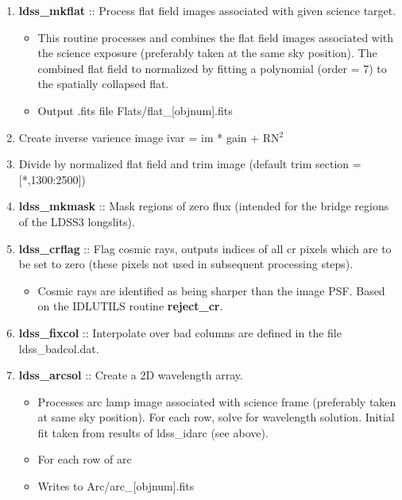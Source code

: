 \documentclass[11pt,letterpaper,dvips]{article}
\begin{document}
\begin{enumerate}
\begin{itemize}
	  \begin{enumerate}
	  \item {\bf ldss\_mkflat} :: Process flat field images
	  associated with given science target. 
	    \begin{itemize}
	      \item This routine processes and combines the flat field
		images associated with the science exposure
		(preferably taken at the same sky position).  The
		combined flat field to normalized by fitting a
		polynomial (order = 7) to the spatially collapsed flat.
	      \item  Output .fits file Flats/flat\_[objnum].fits
	    \end{itemize}

	\item Create inverse varience image ivar = im * gain + RN$^2$

	\item Divide by normalized flat field and trim image (default
	trim section = [*,1300:2500])

	\item {\bf ldss\_mkmask} :: Mask regions of zero flux (intended
	  for the bridge regions of the LDSS3 longslits).  


	\item {\bf ldss\_crflag} :: Flag cosmic rays, outputs indices
	  of all cr pixels which are to be set to zero (these pixels not used
	  in subsequent processing steps).
	    \begin{itemize}
	      \item Cosmic rays are identified as being sharper than
		the image PSF.  Based on the IDLUTILS routine {\bf
		reject\_cr}.
	    \end{itemize}

	\item {\bf ldss\_fixcol} :: Interpolate over bad columns are
	defined in the file ldss\_badcol.dat.

	\item{\bf ldss\_arcsol} :: Create a 2D wavelength array.
	    \begin{itemize}
	      \item Processes arc lamp image associated with science
                frame (preferably taken at same sky position).  For
                each row, solve for wavelength solution.  Initial fit
                taken from results of ldss\_idarc (see above).
	      \item For each row of arc
	      \item Writes to Arc/arc\_[objnum].fits
	    \end{itemize}


\end{enumerate}
\end{itemize}
\end{enumerate}
\end{document}

